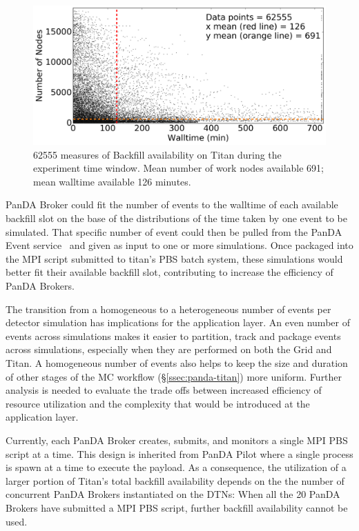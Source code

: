 \begin{figure}[!t]
    \includegraphics[clip,width=\columnwidth]{figures/titan_backfill_avail.png}
    \vspace{-0.1in}
    \caption{62555 measures of Backfill availability on Titan during the
    experiment time window. Mean number of work nodes available 691; mean
    walltime available 126 minutes.}\label{fig:backfill-distrib}
\end{figure}

PanDA Broker could fit the number of events to the walltime of each available
backfill slot on the base of the distributions of the time taken by one event
to be simulated. That specific number of event could then be pulled from the
PanDA Event service~\cite{calafiura2015atlas} and given as input to one or
more simulations. Once packaged into the MPI script submitted to titan's PBS
batch system, these simulations would better fit their available backfill
slot, contributing to increase the efficiency of PanDA Brokers.

The transition from a homogeneous to a heterogeneous number of events per
detector simulation has implications for the application layer. An even
number of events across simulations makes it easier to partition, track and
package events across simulations, especially when they are performed on both
the Grid and Titan. A homogeneous number of events also helps to keep the
size and duration of other stages of the MC workflow
(\S\ref{ssec:panda-titan}) more uniform. Further analysis is needed to
evaluate the trade offs between increased efficiency of resource utilization
and the complexity that would be introduced at the application layer.

Currently, each PanDA Broker creates, submits, and monitors a single MPI PBS
script at a time. This design is inherited from PanDA Pilot where a single
process is spawn at a time to execute the payload. As a consequence, the
utilization of a larger portion of Titan's total backfill availability
depends on the the number of concurrent PanDA Brokers instantiated on the
DTNs: When all the 20 PanDA Brokers have submitted a MPI PBS script, further
backfill availability cannot be used.

